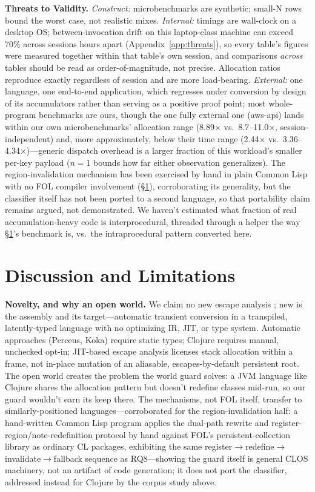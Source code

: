 \documentclass[sigplan,review,anonymous]{acmart}
\begin{document}
\textbf{Threats to Validity.} \emph{Construct:} microbenchmarks are synthetic; small-N rows bound the worst case, not realistic mixes. \emph{Internal:} timings are wall-clock on a desktop OS; between-invocation drift on this laptop-class machine can exceed 70\% across sessions hours apart (Appendix~\ref{app:threats}), so every table's figures were measured together within that table's own session, and comparisons \emph{across} tables should be read as order-of-magnitude, not precise. Allocation ratios reproduce exactly regardless of session and are more load-bearing. \emph{External:} one language, one end-to-end application, which regresses under conversion by design of its accumulators rather than serving as a positive proof point; most whole-program benchmarks are ours, though the one fully external one (aws-api) lands within our own microbenchmarks' allocation range (8.89$\times$ vs.\ 8.7--11.0$\times$, session-independent) and, more approximately, below their time range (2.44$\times$ vs.\ 3.36--4.34$\times$)---generic dispatch overhead is a larger fraction of this workload's smaller per-key payload ($n=1$ bounds how far either observation generalizes). The region-invalidation mechanism has been exercised by hand in plain Common Lisp with no FOL compiler involvement (§\ref{sec:discussion}), corroborating its generality, but the classifier itself has not been ported to a second language, so that portability claim remains argued, not demonstrated. We haven't estimated what fraction of real accumulation-heavy code is interprocedural, threaded through a helper the way §\ref{sec:discussion}'s benchmark is, vs.\ the intraprocedural pattern converted here.

\section{Discussion and Limitations}
\label{sec:discussion}
\textbf{Novelty, and why an open world.} We claim no new escape analysis \cite{hudak1985aggregate}; new is the assembly and its target---automatic transient conversion in a transpiled, latently-typed language with no optimizing IR, JIT, or type system. Automatic approaches (Perceus, Koka) require static types; Clojure requires manual, unchecked opt-in; JIT-based escape analysis licenses stack allocation within a frame, not in-place mutation of an aliasable, escapes-by-default persistent root. The open world creates the problem the world guard solves: a JVM language like Clojure shares the allocation pattern but doesn't redefine classes mid-run, so our guard wouldn't earn its keep there. The mechanisms, not FOL itself, transfer to similarly-positioned languages---corroborated for the region-invalidation half: a hand-written Common Lisp program applies the dual-path rewrite and register-region/note-redefinition protocol by hand against FOL's persistent-collection library as ordinary CL packages, exhibiting the same register$\to$redefine$\to$invalidate$\to$fallback sequence as RQ8---showing the guard itself is general CLOS machinery, not an artifact of code generation; it does not port the classifier, addressed instead for Clojure by the corpus study above.
\end{document}
